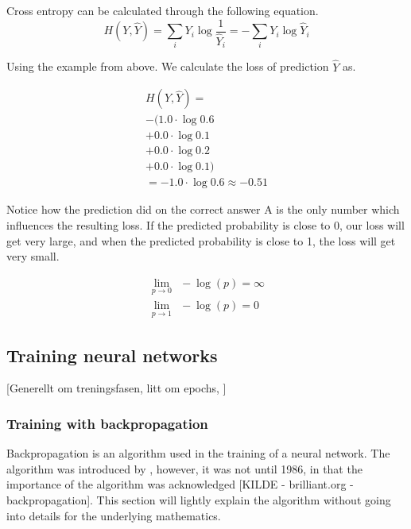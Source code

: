 %
Cross entropy can be calculated through the following equation.
%
\begin{equation} \label{eqn:catcross_ex2}
    H(Y, \hat{Y}) = \sum_i Y_i \log \frac{1}{\hat{Y}_i} = -\sum_i Y_i \log \hat{Y}_i
\end{equation}

Using the example from above. We calculate the loss of prediction $\hat{Y}$ as.

\begin{equation} \label{eqn:catcross_ex3}
\begin{split}
    H(Y, \hat{Y}) = \\
    -( 1.0 \cdot \log 0.6\\
    + 0.0 \cdot \log 0.1\\
    + 0.0 \cdot \log 0.2\\
    + 0.0 \cdot \log 0.1) \\
    = - 1.0 \cdot \log 0.6 \approx -0.51
\end{split}
\end{equation}

Notice how the prediction did on the correct answer A is the only number which influences the resulting loss. If the predicted probability is close to 0, our loss will get very large, and when the predicted probability is close to 1, the loss will get very small.

\begin{equation}
    \begin{split}
            \lim_{p \rightarrow 0}\ \ -\log(p) = \infty \\
            \lim_{p \rightarrow 1}\ \ -\log(p) = 0
    \end{split}
\end{equation}

\subsection{Training neural networks}

[Generellt om treningsfasen, litt om epochs, ]


\subsubsection{Training with backpropagation}
\label{training_with_backpropagation}

Backpropagation is an algorithm used in the training of a neural network. The algorithm was introduced by \cite{werbos_beyond_1974}, however, it was not until 1986, in \cite{rumelhart_learning_1986} that the importance of the algorithm was acknowledged [KILDE - brilliant.org - backpropagation]. This section will lightly explain the algorithm without going into details for the underlying mathematics. 

